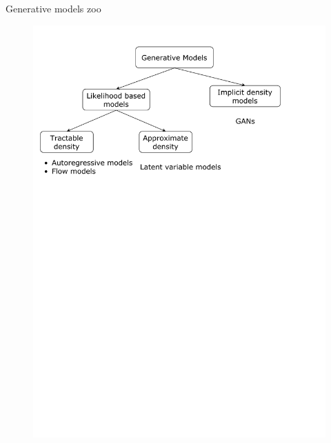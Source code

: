

\begin{frame}
\titlepage
\end{frame}
\begin{frame}{Generative models zoo}
    \begin{figure}
        \centering
        \includegraphics[width=1.0\linewidth]{figs/generative_models_zoo.pdf}
        \label{fig:generative_models_zoo}
    \end{figure}
\end{frame}
